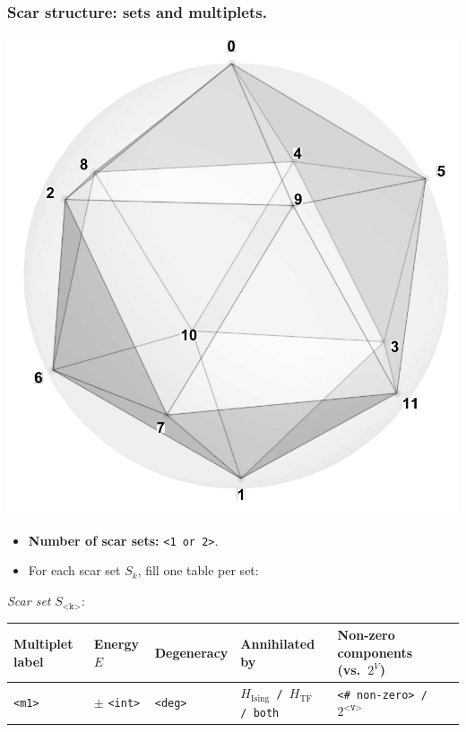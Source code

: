 \documentclass[11pt,a4paper]{article}
\newcommand{\Hising}{H_{\mathrm{Ising}}}
\newcommand{\Htf}{H_{\mathrm{TF}}}
\begin{document}
\subsubsection*{Scar structure: sets and multiplets.}
\begin{center}
  \includegraphics[width=.6\linewidth]{icosahedron}
\end{center}

\begin{itemize}[leftmargin=1.5em]
  \item \textbf{Number of scar sets:} \texttt{<1 or 2>}. 
  \item For each scar set $S_k$, fill one table per set:
\end{itemize}

\noindent\textit{Scar set} $S_{\texttt{<k>}}$:
\begin{center}
\begin{tabular}{L{3.5cm} C{2.2cm} C{2.2cm} C{2.2cm} C{3.0cm} C{3.2cm}}
\toprule
\textbf{Multiplet label} & \textbf{Energy $E$} & \textbf{Degeneracy} & \textbf{Annihilated by} & \textbf{Non-zero components (vs.\ $2^{V}$)} \\
\midrule
\texttt{<m1>} & $\pm$ \texttt{<int>} & \texttt{<deg> } &
\texttt{$\Hising$ / $\Htf$ / both} & \texttt{<\# non-zero> / $2^{\texttt{<V>}}$} \\
\bottomrule
\end{tabular}
\end{center}
\end{document}
